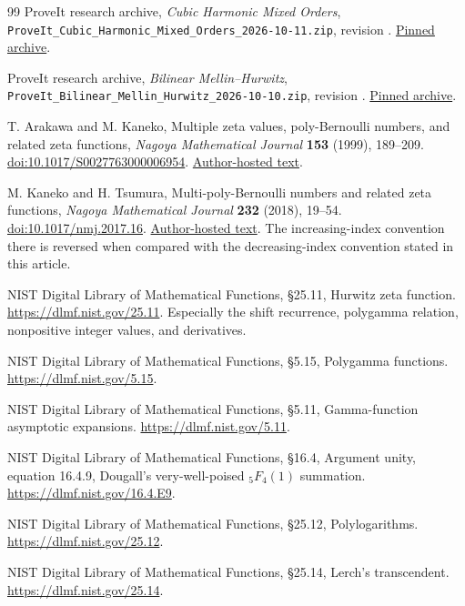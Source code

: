 \begin{thebibliography}{99}
ProveIt research archive,
\emph{Cubic Harmonic Mixed Orders},
\nolinkurl{ProveIt_Cubic_Harmonic_Mixed_Orders_2026-10-11.zip},
revision .
\href{https://github.com/VladimirReshetnikov/ProveIt/blob/921b58f1099568bfefa28a556470e4b29e94eb3b/docs/incoming/ProveIt_Cubic_Harmonic_Mixed_Orders_2026-10-11.zip}{Pinned archive}.

ProveIt research archive,
\emph{Bilinear Mellin--Hurwitz},
\nolinkurl{ProveIt_Bilinear_Mellin_Hurwitz_2026-10-10.zip},
revision .
\href{https://github.com/VladimirReshetnikov/ProveIt/blob/921b58f1099568bfefa28a556470e4b29e94eb3b/docs/incoming/ProveIt_Bilinear_Mellin_Hurwitz_2026-10-10.zip}{Pinned archive}.

T. Arakawa and M. Kaneko,
Multiple zeta values, poly-Bernoulli numbers, and related zeta functions,
\emph{Nagoya Mathematical Journal} \textbf{153} (1999), 189--209.
\href{https://doi.org/10.1017/S0027763000006954}{doi:10.1017/S0027763000006954}.
\href{https://www2.math.kyushu-u.ac.jp/~mkaneko/papers/18MZV_pB_Nagoya.pdf}{Author-hosted text}.

M. Kaneko and H. Tsumura,
Multi-poly-Bernoulli numbers and related zeta functions,
\emph{Nagoya Mathematical Journal} \textbf{232} (2018), 19--54.
\href{https://doi.org/10.1017/nmj.2017.16}{doi:10.1017/nmj.2017.16}.
\href{https://www2.math.kyushu-u.ac.jp/~mkaneko/papers/56Kaneko_Tsumura.pdf}{Author-hosted text}.
The increasing-index convention there is reversed when compared with
the decreasing-index convention stated in this article.

NIST Digital Library of Mathematical Functions,
\S25.11, Hurwitz zeta function.
\url{https://dlmf.nist.gov/25.11}.
Especially the shift recurrence, polygamma relation,
nonpositive integer values, and derivatives.

NIST Digital Library of Mathematical Functions,
\S5.15, Polygamma functions.
\url{https://dlmf.nist.gov/5.15}.

NIST Digital Library of Mathematical Functions,
\S5.11, Gamma-function asymptotic expansions.
\url{https://dlmf.nist.gov/5.11}.

NIST Digital Library of Mathematical Functions,
\S16.4, Argument unity, equation 16.4.9,
Dougall's very-well-poised ${}_5F_4(1)$ summation.
\url{https://dlmf.nist.gov/16.4.E9}.

NIST Digital Library of Mathematical Functions,
\S25.12, Polylogarithms.
\url{https://dlmf.nist.gov/25.12}.

NIST Digital Library of Mathematical Functions,
\S25.14, Lerch's transcendent.
\url{https://dlmf.nist.gov/25.14}.

\end{thebibliography}
